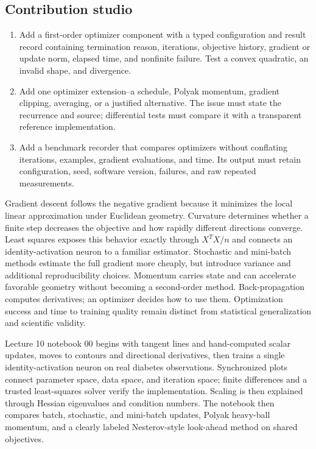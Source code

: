 \subsection*{Contribution studio}

\begin{enumerate}[label=\textbf{GD-PR\arabic*.},leftmargin=*,itemsep=0.65em]
  \item Add a first-order optimizer component with a typed configuration and
  result record containing termination reason, iterations, objective history,
  gradient or update norm, elapsed time, and nonfinite failure. Test a convex
  quadratic, an invalid shape, and divergence.
  \item Add one optimizer extension--a schedule, Polyak momentum, gradient
  clipping, averaging, or a justified alternative. The issue must state the
  recurrence and source; differential tests must compare it with a transparent
  reference implementation.
  \item Add a benchmark recorder that compares optimizers without conflating
  iterations, examples, gradient evaluations, and time. Its output must retain
  configuration, seed, software version, failures, and raw repeated measurements.
\end{enumerate}

\begin{chapterreview}
Gradient descent follows the negative gradient because it minimizes the local
linear approximation under Euclidean geometry. Curvature determines whether a
finite step decreases the objective and how rapidly different directions
converge. Least squares exposes this behavior exactly through $X^TX/n$ and
connects an identity-activation neuron to a familiar estimator. Stochastic and
mini-batch methods estimate the full gradient more cheaply, but introduce
variance and additional reproducibility choices. Momentum carries state and
can accelerate favorable geometry without becoming a second-order method.
Back-propagation computes derivatives; an optimizer decides how to use them.
Optimization success and time to training quality remain distinct from
statistical generalization and scientific validity.
\end{chapterreview}

\begin{notebooklink}
Lecture 10 notebook 00 begins with tangent lines and hand-computed scalar
updates, moves to contours and directional derivatives, then trains a single
identity-activation neuron on real diabetes observations. Synchronized plots
connect parameter space, data space, and iteration space; finite differences
and a trusted least-squares solver verify the implementation. Scaling is then
explained through Hessian eigenvalues and condition numbers. The notebook then
compares batch, stochastic, and mini-batch updates, Polyak heavy-ball momentum,
and a clearly labeled Nesterov-style look-ahead method on shared objectives.
\end{notebooklink}
